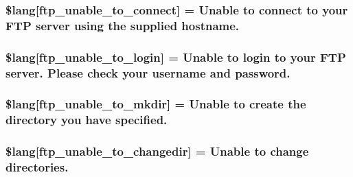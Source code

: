 \subsubsection[{\$lang}]{\setlength{\rightskip}{0pt plus 5cm}\$lang\mbox{[}\textquotesingle{}ftp\+\_\+unable\+\_\+to\+\_\+connect\textquotesingle{}\mbox{]} = \textquotesingle{}Unable to connect to your F\+T\+P server using the supplied hostname.\textquotesingle{}}\label{system_2language_2english_2ftp__lang_8php_a57d51cf019dd2e380b84c6e31cda0cf5}
\hypertarget{system_2language_2english_2ftp__lang_8php_affe13cbf898e1802abb3cd9d9ce2db97}{}
\subsubsection[{\$lang}]{\setlength{\rightskip}{0pt plus 5cm}\$lang\mbox{[}\textquotesingle{}ftp\+\_\+unable\+\_\+to\+\_\+login\textquotesingle{}\mbox{]} = \textquotesingle{}Unable to login to your F\+T\+P server. Please check your username and password.\textquotesingle{}}\label{system_2language_2english_2ftp__lang_8php_affe13cbf898e1802abb3cd9d9ce2db97}
\hypertarget{system_2language_2english_2ftp__lang_8php_acd954089043ea7ad47397376e2630d87}{}
\subsubsection[{\$lang}]{\setlength{\rightskip}{0pt plus 5cm}\$lang\mbox{[}\textquotesingle{}ftp\+\_\+unable\+\_\+to\+\_\+mkdir\textquotesingle{}\mbox{]} = \textquotesingle{}Unable to create the directory you have specified.\textquotesingle{}}\label{system_2language_2english_2ftp__lang_8php_acd954089043ea7ad47397376e2630d87}
\hypertarget{system_2language_2english_2ftp__lang_8php_a2e8eab1a2d2d33cde249097df270b7df}{}
\subsubsection[{\$lang}]{\setlength{\rightskip}{0pt plus 5cm}\$lang\mbox{[}\textquotesingle{}ftp\+\_\+unable\+\_\+to\+\_\+changedir\textquotesingle{}\mbox{]} = \textquotesingle{}Unable to change directories.\textquotesingle{}}\label{system_2language_2english_2ftp__lang_8php_a2e8eab1a2d2d33cde249097df270b7df}
\hypertarget{system_2language_2english_2ftp__lang_8php_a9ffd10144a0dfd5a3c7ab69e4edf1fdf}{}
